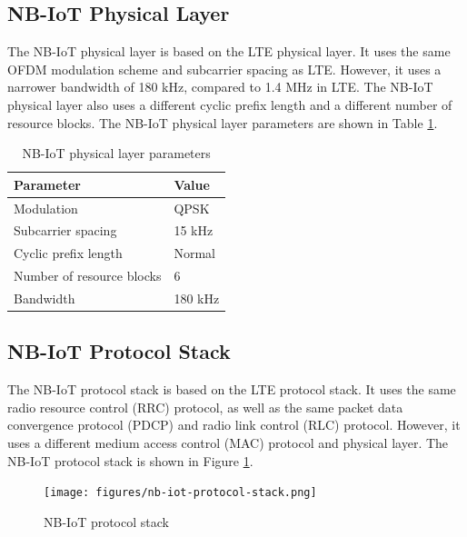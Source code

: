 \subsection{NB-IoT Physical Layer}
The NB-IoT physical layer is based on the LTE physical layer. It uses the same OFDM modulation scheme and subcarrier spacing as LTE. However, it uses a narrower bandwidth of 180 kHz, compared to 1.4 MHz in LTE. The NB-IoT physical layer also uses a different cyclic prefix length and a different number of resource blocks. The NB-IoT physical layer parameters are shown in Table \ref{tab:nb-iot-physical-layer}.
\begin{table}[ht]
    \centering
    \begin{tabular}{|l|l|}
        \hline
        \textbf{Parameter} & \textbf{Value} \\ \hline
        Modulation & QPSK \\ \hline
        Subcarrier spacing & 15 kHz \\ \hline
        Cyclic prefix length & Normal \\ \hline
        Number of resource blocks & 6 \\ \hline
        Bandwidth & 180 kHz \\ \hline
    \end{tabular}
    \caption{NB-IoT physical layer parameters \cite{nb-iot-physical-layer}}
    \label{tab:nb-iot-physical-layer}
\end{table}

\subsection{NB-IoT Protocol Stack}
The NB-IoT protocol stack is based on the LTE protocol stack. It uses the same radio resource control (RRC) protocol, as well as the same packet data convergence protocol (PDCP) and radio link control (RLC) protocol. However, it uses a different medium access control (MAC) protocol and physical layer. The NB-IoT protocol stack is shown in Figure \ref{fig:nb-iot-protocol-stack}.
\begin{figure}[Ht]
    \centering
    \texttt{[image: figures/nb-iot-protocol-stack.png]}
    \caption{NB-IoT protocol stack \cite{nb-iot-protocol-stack}}
    \label{fig:nb-iot-protocol-stack}
\end{figure}

